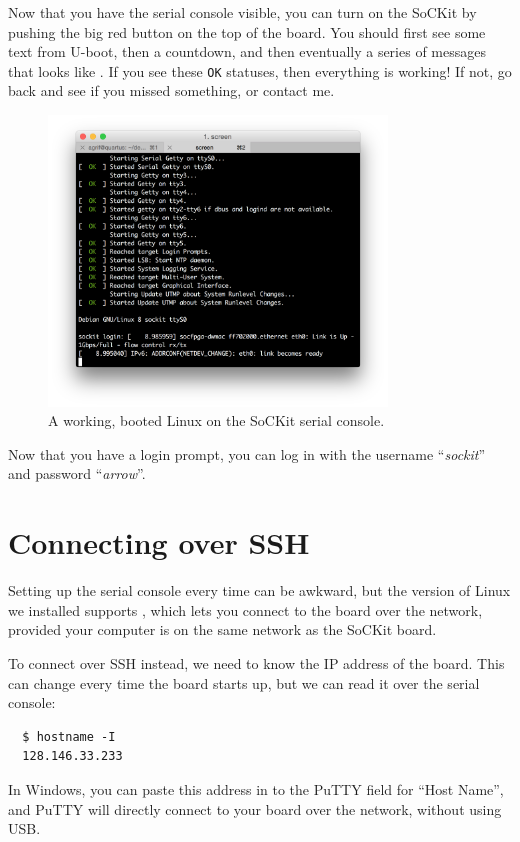 \documentclass{sockitguide}
\begin{document}
Now that you have the serial console visible, you can turn on the
SoCKit by pushing the big red button on the top of the board. You
should first see some text from U-boot, then a countdown, and then
eventually a series of messages that looks like . If
you see these \texttt{OK} statuses, then everything is working! If
not, go back and see if you missed something, or contact me.

\begin{figure}
  \includegraphics[width=9cm]{figures/boot.png}
  \caption{A working, booted Linux on the SoCKit serial console.}
  \label{fig:boot}
\end{figure}

Now that you have a login prompt, you can log in with the username
``\textit{sockit}'' and password ``\textit{arrow}''.

\section{Connecting over SSH}

Setting up the serial console every time can be awkward, but the
version of Linux we installed supports
, which lets
you connect to the board over the network, provided your computer is
on the same network as the SoCKit board.

To connect over SSH instead, we need to know the IP address of the
board. This can change every time the board starts up, but we can read
it over the serial console:
\begin{verbatim}
  $ hostname -I
  128.146.33.233
\end{verbatim}

In Windows, you can paste this address in to the PuTTY field for
``Host Name'', and PuTTY will directly connect to your board over the
network, without using USB.
\end{document}
